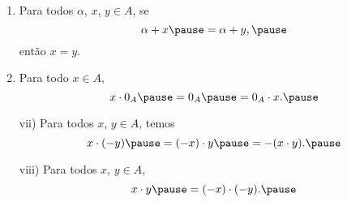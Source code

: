 \documentclass{beamer}
\begin{document}
    \begin{frame}
        \begin{proposicao}
            \begin{enumerate}[label={\roman*})]
                \conti
                
                \item Para todos $\alpha$, \pause $x$, \pause $y \in A$, \pause se
                \[
                    \alpha + x \pause = \alpha + y,\pause
                \]
                ent{\~a}o $x = y$.\pause

                \vspace{.5cm}
                
                \item Para todo $x \in A$, \pause 
                \[
                    x\cdot 0_A \pause = 0_A \pause = 0_A\cdot x.\pause
                \]

                \vspace{.5cm}
            \end{enumerate}
        \end{proposicao}
    \end{frame}

    \begin{frame}
        \begin{proposicao}
            \begin{enumerate}
                \item[vii)] Para todos $x$, \pause $y \in A$, \pause temos\pause
                \[
                    x \cdot (-y) \pause = (-x) \cdot y \pause = -(x \cdot y).\pause
                \]

                \vspace{.5cm}
                
                \item[viii)] Para todos $x$, \pause $y \in A$, \pause
                \[
                    x \cdot y \pause = (-x) \cdot (-y).\pause
                \]

                \vspace{.5cm}
            \end{enumerate}
        \end{proposicao}
    \end{frame}
\end{document}
